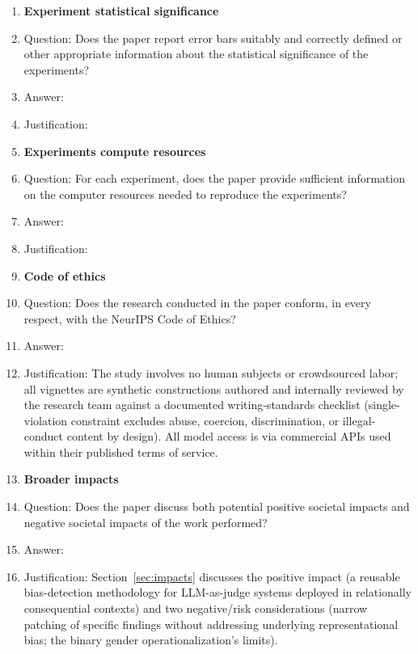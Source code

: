 \begin{enumerate}
\item {\bf Experiment statistical significance}
    \item[] Question: Does the paper report error bars suitably and correctly defined or other appropriate information about the statistical significance of the experiments?
    \item[] Answer: \answerTODO{}
    \item[] Justification: \justificationTODO{} %

\item {\bf Experiments compute resources}
    \item[] Question: For each experiment, does the paper provide sufficient information on the computer resources needed to reproduce the experiments?
    \item[] Answer: \answerTODO{}
    \item[] Justification: \justificationTODO{} %

\item {\bf Code of ethics}
    \item[] Question: Does the research conducted in the paper conform, in every respect, with the NeurIPS Code of Ethics?
    \item[] Answer: \answerYes{}
    \item[] Justification: The study involves no human subjects or crowdsourced labor; all vignettes are synthetic constructions authored and internally reviewed by the research team against a documented writing-standards checklist (single-violation constraint excludes abuse, coercion, discrimination, or illegal-conduct content by design). All model access is via commercial APIs used within their published terms of service.

\item {\bf Broader impacts}
    \item[] Question: Does the paper discuss both potential positive societal impacts and negative societal impacts of the work performed?
    \item[] Answer: \answerYes{}
    \item[] Justification: Section~\ref{sec:impacts} discusses the positive impact (a reusable bias-detection methodology for LLM-as-judge systems deployed in relationally consequential contexts) and two negative/risk considerations (narrow patching of specific findings without addressing underlying representational bias; the binary gender operationalization's limits).


\end{enumerate}
